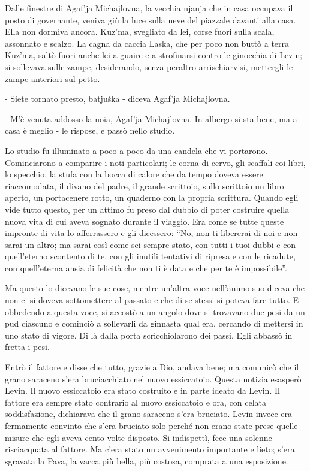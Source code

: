 Dalle finestre di Agaf'ja Michajlovna, la vecchia njanja che in casa occupava il posto di governante, veniva giù la luce sulla neve del piazzale davanti alla casa. Ella non dormiva ancora. Kuz'ma, svegliato da lei, corse fuori sulla scala, assonnato e scalzo. La cagna da caccia Laska, che per poco non buttò a terra Kuz'ma, saltò fuori anche lei a guaire e a strofinarsi contro le ginocchia di Levin; si sollevava sulle zampe, desiderando, senza peraltro arrischiarvisi, mettergli le zampe anteriori sul petto. 

- Siete tornato presto, batjuška - diceva Agaf'ja Michajlovna. 

- M'è venuta addosso la noia, Agaf'ja Michajlovna. In albergo si sta bene, ma a casa è meglio - le rispose, e passò nello studio. 

Lo studio fu illuminato a poco a poco da una candela che vi portarono. Cominciarono a comparire i noti particolari; le corna di cervo, gli scaffali coi libri, lo specchio, la stufa con la bocca di calore che da tempo doveva essere riaccomodata, il divano del padre, il grande scrittoio, sullo scrittoio un libro aperto, un portacenere rotto, un quaderno con la propria scrittura. Quando egli vide tutto questo, per un attimo fu preso dal dubbio di poter costruire quella nuova vita di cui aveva sognato durante il viaggio. Era come se tutte queste impronte di vita lo afferrassero e gli dicessero: ``No, non ti libererai di noi e non sarai un altro; ma sarai così come sei sempre stato, con tutti i tuoi dubbi e con quell'eterno scontento di te, con gli inutili tentativi di ripresa e con le ricadute, con quell'eterna ansia di felicità che non ti è data e che per te è impossibile''. 

Ma questo lo dicevano le sue cose, mentre un'altra voce nell'animo suo diceva che non ci si doveva sottomettere al passato e che di se stessi si poteva fare tutto. E obbedendo a questa voce, si accostò a un angolo dove si trovavano due pesi da un pud ciascuno e cominciò a sollevarli da ginnasta qual era, cercando di mettersi in uno stato di vigore. Di là dalla porta scricchiolarono dei passi. Egli abbassò in fretta i pesi. 

Entrò il fattore e disse che tutto, grazie a Dio, andava bene; ma comunicò che il grano saraceno s'era bruciacchiato nel nuovo essiccatoio. Questa notizia esasperò Levin. Il nuovo essiccatoio era stato costruito e in parte ideato da Levin. Il fattore era sempre stato contrario al nuovo essiccatoio e ora, con celata soddisfazione, dichiarava che il grano saraceno s'era bruciato. Levin invece era fermamente convinto che s'era bruciato solo perché non erano state prese quelle misure che egli aveva cento volte disposto. Si indispettì, fece una solenne risciacquata al fattore. Ma c'era stato un avvenimento importante e lieto; s'era sgravata la Pava, la vacca più bella, più costosa, comprata a una esposizione. 

